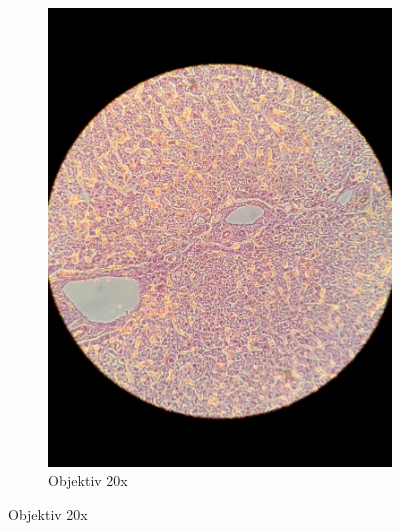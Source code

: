 \begin{figure}[h!]
\begin{subfigure}[b]{0.3\textwidth}
		\includegraphics[width=1\textwidth]{../images/05_human_liver.jpg}
		\caption{Objektiv 20x}
	\end{subfigure}


\end{figure}
